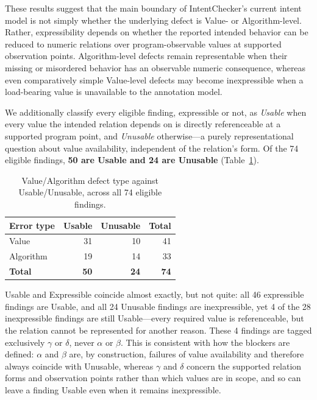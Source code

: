 \documentclass[pdflatex,sn-basic]{sn-jnl}%
\theoremstyle{thmstyleone}%
\theoremstyle{thmstyletwo}%
\theoremstyle{thmstylethree}%
\begin{document}
These results suggest that the main boundary of IntentChecker's current intent model
is not simply whether the underlying defect is Value- or Algorithm-level. Rather,
expressibility depends on whether the reported intended behavior can be reduced to
numeric relations over program-observable values at supported observation points.
Algorithm-level defects remain representable when their missing or misordered behavior
has an observable numeric consequence, whereas even comparatively simple Value-level
defects may become inexpressible when a load-bearing value is unavailable to the
annotation model.

We additionally classify every eligible finding, expressible or not, as \emph{Usable}
when every value the intended relation depends on is directly referenceable at a
supported program point, and \emph{Unusable} otherwise---a purely representational
question about value availability, independent of the relation's form. Of the 74
eligible findings, \textbf{50 are Usable and 24 are Unusable}
(Table~\ref{tab:rq1-usable}).

\begin{table}[t]
\centering
\caption{Value/Algorithm defect type against Usable/Unusable, across all 74 eligible findings.}
\label{tab:rq1-usable}
\small
\begin{tabular}{lrrr}
\toprule
\textbf{Error type} & \textbf{Usable} & \textbf{Unusable} & \textbf{Total} \\
\midrule
Value     & 31 & 10 & 41 \\
Algorithm & 19 & 14 & 33 \\
\midrule
\textbf{Total} & \textbf{50} & \textbf{24} & \textbf{74} \\
\bottomrule
\end{tabular}
\end{table}

Usable and Expressible coincide almost exactly, but not quite: all 46 expressible
findings are Usable, and all 24 Unusable findings are inexpressible, yet 4 of the 28
inexpressible findings are still Usable---every required value is referenceable, but
the relation cannot be represented for another reason. These 4 findings are tagged
exclusively $\gamma$ or $\delta$, never $\alpha$ or $\beta$. This is consistent with
how the blockers are defined: $\alpha$ and $\beta$ are, by construction, failures of
value availability and therefore always coincide with Unusable, whereas $\gamma$ and
$\delta$ concern the supported relation forms and observation points rather than
which values are in scope, and so can leave a finding Usable even when it remains
inexpressible.
\end{document}
